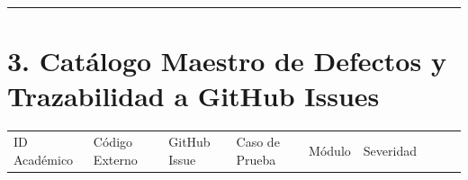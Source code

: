 \documentclass[10pt,a4paper]{article}
\newcounter{none}
\begin{document}
\endgroup\medskip

\begin{center}\rule{0.5\linewidth}{0.5pt}\end{center}


\section{3. Catálogo Maestro de Defectos y Trazabilidad a GitHub Issues}\label{3-catuxe1logo-maestro-de-defectos-y-trazabilidad-a-github-issues}

\begingroup\singlespacing\scriptsize\setlength{\parskip}{0pt}

{\def\LTcaptype{none} %
\begin{longtable}[]{@{}
  >{\raggedright\arraybackslash}p{}
  >{\raggedright\arraybackslash}p{}
  >{\raggedright\arraybackslash}p{}
  >{\raggedright\arraybackslash}p{}
  >{\raggedright\arraybackslash}p{}
  >{\raggedright\arraybackslash}p{}
  >{\raggedright\arraybackslash}p{}
  >{\raggedright\arraybackslash}p{}
  >{\raggedright\arraybackslash}p{}@{}}
\toprule\noalign{}
\begin{minipage}[b]{\linewidth}\raggedright
ID Académico
\end{minipage} & \begin{minipage}[b]{\linewidth}\raggedright
Código Externo
\end{minipage} & \begin{minipage}[b]{\linewidth}\raggedright
GitHub Issue
\end{minipage} & \begin{minipage}[b]{\linewidth}\raggedright
Caso de Prueba
\end{minipage} & \begin{minipage}[b]{\linewidth}\raggedright
Módulo
\end{minipage} & \begin{minipage}[b]{\linewidth}\raggedright
Severidad
\end{minipage} & \begin{minipage}[b]{\linewidth}\raggedright

\end{minipage}
\end{longtable}}
\end{document}
